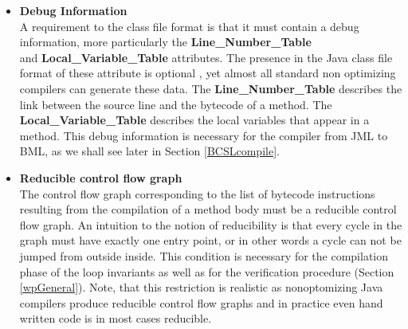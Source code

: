 \begin{itemize}
  \item \textbf{Debug Information} \\ 
       A requirement to the class file format is that it must contain a debug information, more particularly
       the \textbf{Line\_Number\_Table} \\ 
       and \textbf{Local\_Variable\_Table}  attributes. The presence in the Java class file format of 
       these attribute is optional \cite{VMSpec}, yet almost all standard non optimizing compilers can generate these data. 
       The \textbf{Line\_Number\_Table} describes the link between the source line and the bytecode of a method.  
       The \textbf{Local\_Variable\_Table} describes the local variables that appear in a method.  
       This debug information is necessary for the compiler from JML to BML, as we shall see later in Section \ref{BCSLcompile}.

\item  \textbf{Reducible control flow graph} \\ 
       The control flow graph corresponding to the list of bytecode instructions resulting from the compilation of a method
       body must be a reducible control flow graph. An intuition to the notion of reducibility is that every cycle in the
       graph must have exactly one entry point, 
       or in other words a cycle can not be jumped from outside inside. This condition is necessary for the compilation
       phase of the loop  invariants as well as for the verification procedure (Section \ref{wpGeneral}).
       Note, that this restriction is realistic as nonoptomizing Java compilers produce
       reducible control flow graphs and in  practice even hand written code is in most cases reducible. 
\end{itemize}





